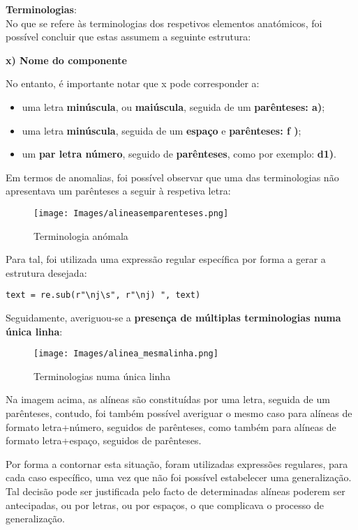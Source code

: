 \textbf{Terminologias}:\\
No que se refere às terminologias dos respetivos elementos anatómicos, foi possível concluir que estas assumem a seguinte estrutura:
\begin{center}
    \textbf{x) Nome do componente}
\end{center}
No entanto, é importante notar que x pode corresponder a:
\begin{itemize}
    \item uma letra \textbf{minúscula}, ou \textbf{maiúscula}, seguida de um \textbf{parênteses: a)};

    \item uma letra \textbf{minúscula}, seguida de um \textbf{espaço} e \textbf{parênteses: f )};

    \item um \textbf{par letra número}, seguido de \textbf{parênteses}, como por exemplo: \textbf{d1)}.
\end{itemize}

Em termos de anomalias, foi possível observar que uma das terminologias não apresentava um parênteses a seguir à respetiva letra:

\begin{figure}[H]
    \centering
    \centering
    \texttt{[image: Images/alineasemparenteses.png]}
    \caption{Terminologia anómala}
    \label{fig:semparenteses}
\end{figure}
Para tal, foi utilizada uma expressão regular específica por forma a gerar a estrutura desejada:
\begin{lstlisting}[style=pythonstyle]
text = re.sub(r"\nj\s", r"\nj) ", text)
\end{lstlisting}

Seguidamente, averiguou-se a \textbf{presença de múltiplas terminologias numa única linha}:

\begin{figure}[H]
    \centering
    \centering
    \texttt{[image: Images/alinea\_mesmalinha.png]}
    \caption{Terminologias numa única linha}
    \label{fig:mesmalinha}
\end{figure}
Na imagem acima, as alíneas são constituídas por uma letra, seguida de um parênteses, contudo, foi também possível averiguar o mesmo caso para alíneas de formato letra+número, seguidos de parênteses, como também para alíneas de formato letra+espaço, seguidos de parênteses.

Por forma a contornar esta situação, foram utilizadas expressões regulares, para cada caso específico, uma vez que não foi possível estabelecer uma generalização. Tal decisão pode ser justificada pelo facto de determinadas alíneas poderem ser antecipadas, ou por letras, ou por espaços, o que complicava o processo de generalização.

